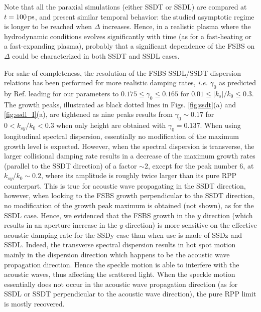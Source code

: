 \documentclass[
 reprint,
 amsmath,amssymb,
 aps,
]{revtex4-1}
\begin{document}
Note that all the paraxial simulations (either SSDT or SSDL) are compared at $t=100 \,\rm ps$,  and present similar temporal behavior: the studied asymptotic regime is longer to be reached when $\Delta$ increases. Hence, in a realistic plasma where the hydrodynamic conditions evolves significantly with time (as for a fast-heating or a fast-expanding plasma), probably that a significant dependence of the FSBS on $\Delta$ could be characterized in both SSDT and SSDL cases.  

For sake of completeness, the resolution of the FSBS SSDL/SSDT dispersion relations has been performed for more realistic  damping rates, \emph{i.e.} $\gamma_0$ as predicted by Ref. \cite[]{casanova_1989} leading for our parameters to $ 0.175\le \gamma_0\le 0.165$ for $0.01\le \vert k_s\vert /k_0\le 0.3$. The growth peaks, illustrated  as black dotted lines in Figs. \ref{fig:ssdt}(a) and  \ref{fig:ssdl_I}(a), are tightened as nine peaks results from $\gamma_0\sim 0.17$ for $0<k_{sy}/k_0<0.3$ when only height are obtained with $\gamma_0=0.137$. When using longitudinal spectral  dispersion, essentially no modification of the maximum growth level is expected. However, when the spectral dispersion is transverse, the larger collisional damping rate results in a decrease of the maximum growth rates (parallel to the SSDT direction) of  a factor $\sim 2$, except for the peak number 6, at $k_{sy}/k_0\sim 0.2$, where its amplitude is roughly twice larger than its pure RPP counterpart.  This is true for acoustic wave propagating in the SSDT direction, however, when looking to the FSBS growth perpendicular to the SSDT direction, no modification of the growth peak maximum is obtained (not shown), as for the  SSDL case.   
Hence, we evidenced that 
the FSBS growth  in the $y$ direction (which results in an aperture increase in the $y$ direction) is more sensitive  on the effective acoustic damping rate 
for the SSDy case than when use is made of  SSDz and SSDL.
Indeed, the transverse spectral dispersion results in  hot spot motion mainly in the dispersion direction which happens to be the acoustic wave propagation direction.
Hence the speckle motion is able to interfere with the acoustic waves, thus affecting the scattered light. 
When the speckle motion essentially does not occur in the acoustic wave propagation direction (as for SSDL or SSDT perpendicular to the acoustic wave direction), the pure RPP limit is mostly recovered. 
\end{document}
